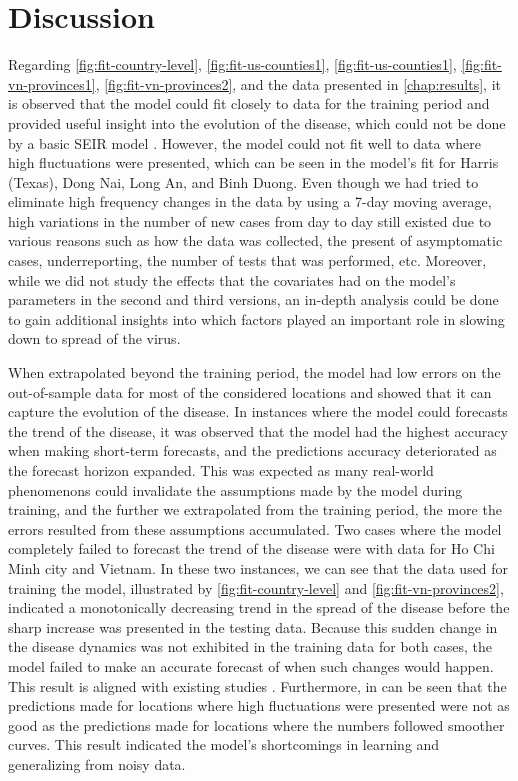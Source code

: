 \chapter{Discussion}
\label{chap:discussion}

Regarding \autoref{fig:fit-country-level}, \autoref{fig:fit-us-counties1}, \autoref{fig:fit-us-counties1}, \autoref{fig:fit-vn-provinces1}, \autoref{fig:fit-vn-provinces2}, and the data presented in \autoref{chap:results}, it is observed that the model could fit closely to data for the training period and provided useful insight into the evolution of the disease, which could not be done by a basic \gls{SEIR} model \cite{dandekarMachineLearningAidedGlobal2020a}.
However, the model could not fit well to data where high fluctuations were presented, which can be seen in the model's fit for Harris (Texas), Dong Nai, Long An, and Binh Duong.
Even though we had tried to eliminate high frequency changes in the data by using a 7-day moving average, high variations in the number of new cases from day to day still existed due to various reasons such as how the data was collected, the present of asymptomatic cases, underreporting, the number of tests that was performed, etc.
Moreover, while we did not study the effects that the covariates had on the model's parameters in the second and third versions, an in-depth analysis could be done to gain additional insights into which factors played an important role in slowing down to spread of the virus.

When extrapolated beyond the training period, the model had low errors on the out-of-sample data for most of the considered locations and showed that it can capture the evolution of the disease.
In instances where the model could forecasts the trend of the disease, it was observed that the model had the highest accuracy when making short-term forecasts, and the predictions accuracy deteriorated as the forecast horizon expanded.
This was expected as many real-world phenomenons could invalidate the assumptions made by the model during training, and the further we extrapolated from the training period, the more the errors resulted from these assumptions accumulated.
Two cases where the model completely failed to forecast the trend of the disease were with data for Ho Chi Minh city and Vietnam.
In these two instances, we can see that the data used for training the model, illustrated by \autoref{fig:fit-country-level} and \autoref{fig:fit-vn-provinces2}, indicated a monotonically decreasing trend in the spread of the disease before the sharp increase was presented in the testing data.
Because this sudden change in the disease dynamics was not exhibited in the training data for both cases, the model failed to make an accurate forecast of when such changes would happen.
This result is aligned with existing studies \cite{arikInterpretableSequenceLearning}.
Furthermore, in can be seen that the predictions made for locations where high fluctuations were presented were not as good as the predictions made for locations where the numbers followed smoother curves.
This result indicated the model's shortcomings in learning and generalizing from noisy data.


